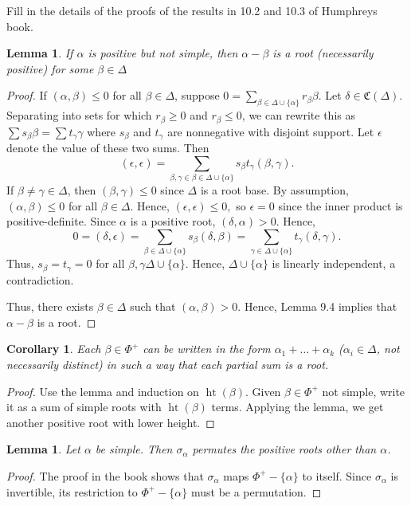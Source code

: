 \documentclass{article}
\DeclareMathOperator{\hht}{ht}
\newcommand{\mf}{\mathfrak}
\newtheorem{lem}[thm]{Lemma}
\newtheorem{cor}[thm]{Corollary}
\begin{document}
 Fill in the details of the proofs of the results in 10.2 and 10.3 of Humphreys book.

\begin{lem} If $\alpha$ is positive but not simple, then $\alpha - \beta$ is a root 
(necessarily positive) for some $\beta \in \Delta$
\end{lem}
\begin{proof}
If $(\alpha, \beta) \le 0$ for all $\beta \in \Delta$, suppose
$0 = \sum_{\beta \in \Delta \cup \{ \alpha \}} r_\beta \beta$. Let $\delta \in \mf{C}(\Delta)$.
 Separating into sets for which $r_\beta \ge 0$ and $r_\beta \le 0$, we can rewrite this as
$\sum s_\beta \beta = \sum t_\gamma \gamma$ where $s_\beta$ and $t_\gamma$
are nonnegative with disjoint support.  Let $\epsilon$ denote the value
of these two sums.  Then
$$(\epsilon, \epsilon) = \sum_{\beta, \gamma \in \beta \in \Delta \cup \{ \alpha \}} s_\beta t_\gamma (\beta, \gamma).$$
If $\beta \neq \gamma \in \Delta$, then $(\beta, \gamma) \le 0$ since $\Delta$ is a root base. By assumption,
$(\alpha, \beta) \le 0$ for all $\beta \in \Delta$.  Hence, 
$(\epsilon, \epsilon) \le 0,$
so $\epsilon = 0$ since the inner product is positive-definite.  
Since $\alpha$ is a positive root, $(\delta, \alpha) > 0$.  Hence,
$$0 = (\delta, \epsilon) = \sum_{\beta \in \Delta \cup \{ \alpha \}} s_\beta (\delta, \beta) = \sum_{\gamma \in \Delta \cup \{ \alpha \}} t_\gamma (\delta, \gamma).$$
Thus, $s_\beta = t_\gamma = 0$ for all $\beta, \gamma \Delta \cup \{ \alpha \}$.  Hence, $\Delta \cup \{ \alpha \}$ is linearly independent, a contradiction.

Thus, there exists $\beta \in \Delta$ such that $(\alpha, \beta) > 0$.  Hence, Lemma 9.4 implies that $\alpha - \beta$ is a root.
\end{proof}

\begin{cor} Each $\beta \in \Phi^+$ can be written in the form $\alpha_1 + \ldots + \alpha_k$ ($\alpha_i \in \Delta$, not
necessarily distinct) in such a way that each partial sum is a root.
\end{cor}
\begin{proof}
Use the lemma and induction on $\hht(\beta)$.  Given $\beta \in \Phi^+$ not simple, write it as a sum of simple roots with $\hht(\beta)$ terms.
Applying the lemma, we get another positive root with lower height.
\end{proof}

\begin{lem}  Let $\alpha$ be simple.  Then $\sigma_\alpha$ permutes the positive roots other than $\alpha$.
\end{lem}
\begin{proof}
The proof in the book shows that $\sigma_\alpha$ maps $\Phi^+ - \{\alpha\}$ to itself.  Since $\sigma_\alpha$ is invertible, its restriction to $\Phi^+ - \{\alpha\}$ must be a permutation.
\end{proof}
\end{document}
